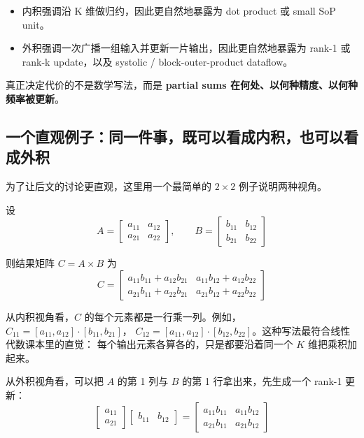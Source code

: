 \documentclass[UTF8,11pt,a4paper]{ctexart}
\begin{document}
\begin{itemize}
  \item 内积强调沿 K 维做归约，因此更自然地暴露为 dot product 或 small SoP unit。
  \item 外积强调一次广播一组输入并更新一片输出，因此更自然地暴露为 rank-1 或 rank-k
  update，以及 systolic / block-outer-product dataflow。
\end{itemize}

真正决定代价的不是数学写法，而是 \textbf{partial sums 在何处、以何种精度、以何种频率被更新}。

\subsection{一个直观例子：同一件事，既可以看成内积，也可以看成外积}

为了让后文的讨论更直观，这里用一个最简单的 $2\times 2$ 例子说明两种视角。

设
\begin{equation}
  A=
  \begin{bmatrix}
    a_{11} & a_{12}\\
    a_{21} & a_{22}
  \end{bmatrix},
  \qquad
  B=
  \begin{bmatrix}
    b_{11} & b_{12}\\
    b_{21} & b_{22}
  \end{bmatrix}
\end{equation}

则结果矩阵 $C=A\times B$ 为
\begin{equation}
  C=
  \begin{bmatrix}
    a_{11}b_{11}+a_{12}b_{21} & a_{11}b_{12}+a_{12}b_{22}\\
    a_{21}b_{11}+a_{22}b_{21} & a_{21}b_{12}+a_{22}b_{22}
  \end{bmatrix}
\end{equation}

从内积视角看，$C$ 的每个元素都是一行乘一列。例如，
$C_{11}= [a_{11},a_{12}] \cdot [b_{11},b_{21}]$，
$C_{12}= [a_{11},a_{12}] \cdot [b_{12},b_{22}]$。这种写法最符合线性代数课本里的直觉：
每个输出元素各算各的，只是都要沿着同一个 $K$ 维把乘积加起来。

从外积视角看，可以把 $A$ 的第 1 列与 $B$ 的第 1 行拿出来，先生成一个 rank-1 更新：
\begin{equation}
  \begin{bmatrix}
    a_{11}\\
    a_{21}
  \end{bmatrix}
  \begin{bmatrix}
    b_{11} & b_{12}
  \end{bmatrix}
  =
  \begin{bmatrix}
    a_{11}b_{11} & a_{11}b_{12}\\
    a_{21}b_{11} & a_{21}b_{12}
  \end{bmatrix}
\end{equation}
\end{document}
